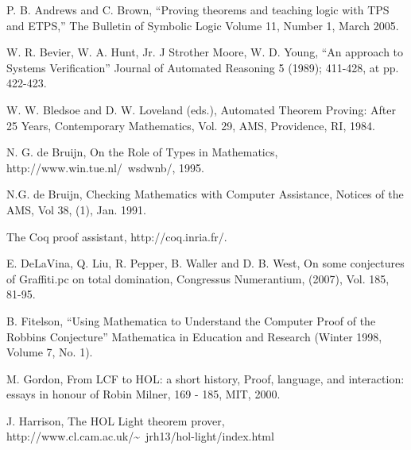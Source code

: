 \documentclass{llncs}
\begin{document}
\begin{thebibliography}{A}

 P. B. Andrews and C. Brown, ``Proving theorems and teaching logic with 
TPS and ETPS,'' The Bulletin of Symbolic Logic 
Volume 11, Number 1, March 2005.

 W. R. Bevier, W. A. Hunt, Jr. J Strother Moore, W. D. Young, ``An approach to Systems Verification''  Journal of Automated Reasoning 5 (1989); 411-428, at pp. 422-423.

 W. W. Bledsoe and D. W. Loveland (eds.), Automated
Theorem Proving: After 25 Years, Contemporary Mathematics, Vol. 29,
AMS, Providence, RI, 1984.


 N. G. de Bruijn, On the Role of Types in Mathematics,
http://www.win.tue.nl/~wsdwnb/, 
1995.

  N.G. de Bruijn, Checking Mathematics with Computer Assistance, Notices of the AMS,
Vol 38, (1), Jan. 1991.

 The Coq proof assistant, http://coq.inria.fr/.



 E. DeLaVina, Q. Liu, R. Pepper, B. Waller and D. B. West, On some conjectures of
Graffiti.pc on total domination, Congressus Numerantium, (2007), Vol. 185, 81-95.

  B. Fitelson, ``Using Mathematica to Understand the Computer Proof of the Robbins Conjecture''
Mathematica in Education and Research (Winter 1998, Volume 7, No. 1).


 M. Gordon, From LCF to HOL: a short history,
Proof, language, and interaction: essays in honour of Robin Milner,
169 - 185, MIT, 2000.

 J. Harrison, The HOL Light theorem prover,
http://www.cl.cam.ac.uk/\~~jrh13/hol-light/index.html


\end{thebibliography}
\end{document}
